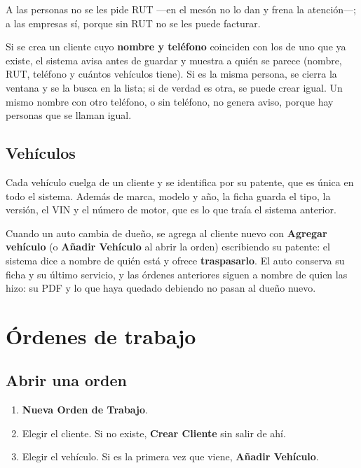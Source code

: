 \documentclass[11pt,a4paper]{article}
\begin{document}
A las personas no se les pide RUT —en el mesón no lo dan y frena la atención—;
a las empresas sí, porque sin RUT no se les puede facturar.

Si se crea un cliente cuyo \textbf{nombre y teléfono} coinciden con los de uno
que ya existe, el sistema avisa antes de guardar y muestra a quién se parece
(nombre, RUT, teléfono y cuántos vehículos tiene). Si es la misma persona, se
cierra la ventana y se la busca en la lista; si de verdad es otra, se puede
crear igual. Un mismo nombre con otro teléfono, o sin teléfono, no genera aviso,
porque hay personas que se llaman igual.

\subsection{Vehículos}


Cada vehículo cuelga de un cliente y se identifica por su patente, que es única
en todo el sistema. Además de marca, modelo y año, la ficha guarda el tipo, la
versión, el VIN y el número de motor, que es lo que traía el sistema anterior.

Cuando un auto cambia de dueño, se agrega al cliente nuevo con \textbf{Agregar
vehículo} (o \textbf{Añadir Vehículo} al abrir la orden) escribiendo su patente:
el sistema dice a nombre de quién está y ofrece \textbf{traspasarlo}. El auto
conserva su ficha y su último servicio, y las órdenes anteriores siguen a nombre
de quien las hizo: su PDF y lo que haya quedado debiendo no pasan al dueño nuevo.

\section{Órdenes de trabajo}


\subsection{Abrir una orden}

\begin{enumerate}
  \item \textbf{Nueva Orden de Trabajo}.
  \item Elegir el cliente. Si no existe, \textbf{Crear Cliente} sin salir de ahí.
  \item Elegir el vehículo. Si es la primera vez que viene, \textbf{Añadir
        Vehículo}.
\end{enumerate}
\end{document}
